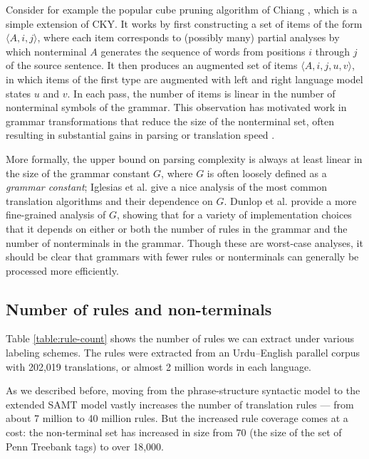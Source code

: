 \documentclass[a4paper]{article}
\begin{document}
Consider for example the popular cube pruning algorithm of Chiang
, which is a simple extension of CKY. It works by first
constructing a set of items of the form $\langle A, i, j \rangle$,
where each item corresponds to (possibly many) partial analyses by
which nonterminal $A$ generates the sequence of words from positions
$i$ through $j$ of the source sentence. It then produces an augmented
set of items $\langle A, i, j, u, v \rangle$, in which items of the
first type are augmented with left and right language model states $u$
and $v$. In each pass, the number of items is linear in the number of
nonterminal symbols of the grammar. This observation has motivated
work in grammar transformations that reduce the size of the
nonterminal set, often resulting in substantial gains in parsing or
translation speed \cite{song2008,denero-efficient-parsing,xiao2009}.

More formally, the upper bound on parsing complexity is always at
least linear in the size of the grammar constant $G$, where $G$ is
often loosely defined as a {\it grammar constant}; Iglesias et al.
 give a nice analysis of the most common translation algorithms
and their dependence on $G$. Dunlop et al.  provide a more
fine-grained analysis of $G$, showing that for a variety of
implementation choices that it depends on either or both the number of
rules in the grammar and the number of nonterminals in the grammar.
Though these are worst-case analyses, it should be clear that grammars
with fewer rules or nonterminals can generally be processed more
efficiently.

\subsection{Number of rules and non-terminals}

Table \ref{table:rule-count} shows the number of rules we can extract under various labeling schemes. The rules were extracted from an Urdu--English parallel corpus with 202,019 translations, or almost 2 million words in each language.

As we described before, moving from the phrase-structure syntactic model to the extended SAMT model vastly increases the number of translation rules --- from about 7 million to 40 million rules. But the increased rule coverage comes at a cost: the non-terminal set has increased in size from 70 (the size of the set of Penn Treebank tags) to over 18,000.
\end{document}
